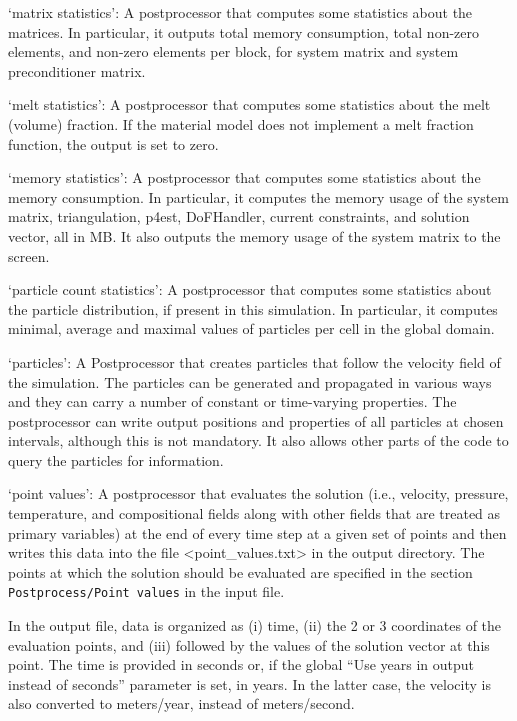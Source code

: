 \begin{itemize}

`matrix statistics': A postprocessor that computes some statistics about the matrices. In particular, it outputs total memory consumption, total non-zero elements, and non-zero elements per block, for system matrix and system preconditioner matrix.

`melt statistics': A postprocessor that computes some statistics about the melt (volume) fraction. If the material model does not implement a melt fraction function, the output is set to zero.

`memory statistics': A postprocessor that computes some statistics about the memory consumption. In particular, it computes the memory usage of the system matrix, triangulation, p4est, DoFHandler, current constraints, and solution vector, all in MB. It also outputs the memory usage of the system matrix to the screen.

`particle count statistics': A postprocessor that computes some statistics about the particle distribution, if present in this simulation. In particular, it computes minimal, average and maximal values of particles per cell in the global domain.

`particles': A Postprocessor that creates particles that follow the velocity field of the simulation. The particles can be generated and propagated in various ways and they can carry a number of constant or time-varying properties. The postprocessor can write output positions and properties of all particles at chosen intervals, although this is not mandatory. It also allows other parts of the code to query the particles for information.

`point values': A postprocessor that evaluates the solution (i.e., velocity, pressure, temperature, and compositional fields along with other fields that are treated as primary variables) at the end of every time step at a given set of points and then writes this data into the file <point\_values.txt> in the output directory. The points at which the solution should be evaluated are specified in the section \texttt{Postprocess/Point values} in the input file.

In the output file, data is organized as (i) time, (ii) the 2 or 3 coordinates of the evaluation points, and (iii) followed by the values of the solution vector at this point. The time is provided in seconds or, if the global ``Use years in output instead of seconds'' parameter is set, in years. In the latter case, the velocity is also converted to meters/year, instead of meters/second.


\end{itemize}
